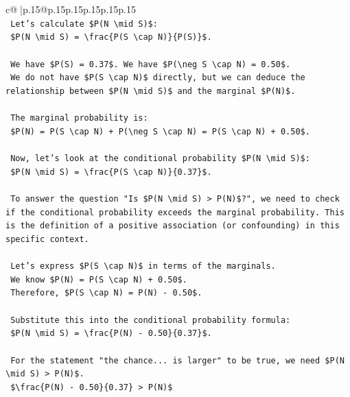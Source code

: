 \documentclass{article}
\begin{document}
{\begin{supertabular}{c@{$\;$}|p{.15\linewidth}@{}p{.15\linewidth}p{.15\linewidth}p{.15\linewidth}p{.15\linewidth}p{.15\linewidth}}
{{{\\ 
\texttt{    Let's calculate \$P(N \textbackslash{}mid S)\$:} \\
\texttt{    \$P(N \textbackslash{}mid S) = \textbackslash{}frac\{P(S \textbackslash{}cap N)\}\{P(S)\}\$.} \\
\\ 
\texttt{    We have \$P(S) = 0.37\$. We have \$P(\textbackslash{}neg S \textbackslash{}cap N) = 0.50\$.} \\
\texttt{    We do not have \$P(S \textbackslash{}cap N)\$ directly, but we can deduce the relationship between \$P(N \textbackslash{}mid S)\$ and the marginal \$P(N)\$.} \\
\\ 
\texttt{    The marginal probability is:} \\
\texttt{    \$P(N) = P(S \textbackslash{}cap N) + P(\textbackslash{}neg S \textbackslash{}cap N) = P(S \textbackslash{}cap N) + 0.50\$.} \\
\\ 
\texttt{    Now, let's look at the conditional probability \$P(N \textbackslash{}mid S)\$:} \\
\texttt{    \$P(N \textbackslash{}mid S) = \textbackslash{}frac\{P(S \textbackslash{}cap N)\}\{0.37\}\$.} \\
\\ 
\texttt{    To answer the question "Is \$P(N \textbackslash{}mid S) > P(N)\$?", we need to check if the conditional probability exceeds the marginal probability. This is the definition of a positive association (or confounding) in this specific context.} \\
\\ 
\texttt{    Let's express \$P(S \textbackslash{}cap N)\$ in terms of the marginals.} \\
\texttt{    We know \$P(N) = P(S \textbackslash{}cap N) + 0.50\$.} \\
\texttt{    Therefore, \$P(S \textbackslash{}cap N) = P(N) {-} 0.50\$.} \\
\\ 
\texttt{    Substitute this into the conditional probability formula:} \\
\texttt{    \$P(N \textbackslash{}mid S) = \textbackslash{}frac\{P(N) {-} 0.50\}\{0.37\}\$.} \\
\\ 
\texttt{    For the statement "the chance... is larger" to be true, we need \$P(N \textbackslash{}mid S) > P(N)\$.} \\
\texttt{    \$\textbackslash{}frac\{P(N) {-} 0.50\}\{0.37\} > P(N)\$} \\
}}}
\end{supertabular}}
\end{document}
